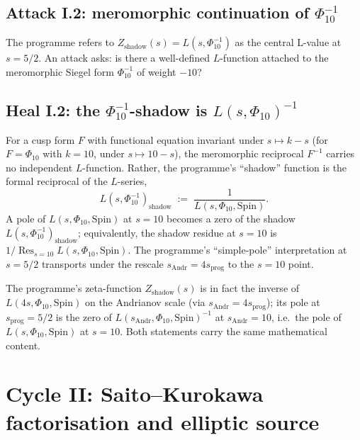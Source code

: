 \subsection*{Attack I.2: meromorphic continuation of $\Phi_{10}^{-1}$}

The programme refers to $Z_{\mathrm{shadow}}(s) = L(s, \Phi_{10}^{-1})$
as the central L-value at $s = 5/2$.  An attack asks: is there a
well-defined $L$-function attached to the meromorphic Siegel form
$\Phi_{10}^{-1}$ of weight $-10$?

\subsection*{Heal I.2: the $\Phi_{10}^{-1}$-shadow is $L(s, \Phi_{10})^{-1}$}

For a cusp form $F$ with functional equation invariant under $s \mapsto
k - s$ (for $F = \Phi_{10}$ with $k = 10$, under $s \mapsto 10 - s$),
the meromorphic reciprocal $F^{-1}$ carries no independent $L$-function.
Rather, the programme's ``shadow'' function is the formal reciprocal
of the $L$-series,
\[
 L(s, \Phi_{10}^{-1})_{\mathrm{shadow}} \;:=\; \frac{1}{L(s, \Phi_{10}, \mathrm{Spin})}.
\]
A pole of $L(s, \Phi_{10}, \mathrm{Spin})$ at $s = 10$ becomes a zero of
the shadow $L(s, \Phi_{10}^{-1})_{\mathrm{shadow}}$; equivalently, the
shadow residue at $s = 10$ is $1 / \operatorname{Res}_{s=10}
L(s, \Phi_{10}, \mathrm{Spin})$.  The programme's ``simple-pole''
interpretation at $s = 5/2$ transports under the rescale $s_{\mathrm{Andr}}
= 4 s_{\mathrm{prog}}$ to the $s = 10$ point.

\begin{remark}[Sign of the shadow at $s = 5/2$]
\label{rem:shadow-sign-5-2}
The programme's zeta-function $Z_{\mathrm{shadow}}(s)$ is in fact the
inverse of $L(4s, \Phi_{10}, \mathrm{Spin})$ on the Andrianov scale
(via $s_{\mathrm{Andr}} = 4 s_{\mathrm{prog}}$); its pole at
$s_{\mathrm{prog}} = 5/2$ is the zero of
$L(s_{\mathrm{Andr}}, \Phi_{10}, \mathrm{Spin})^{-1}$ at
$s_{\mathrm{Andr}} = 10$, i.e.\ the pole of $L(s, \Phi_{10},
\mathrm{Spin})$ at $s = 10$.  Both statements carry the same
mathematical content.
\end{remark}


\section{Cycle II: Saito--Kurokawa factorisation and elliptic source}
\label{sec:cycle-2-sk-factorisation}

